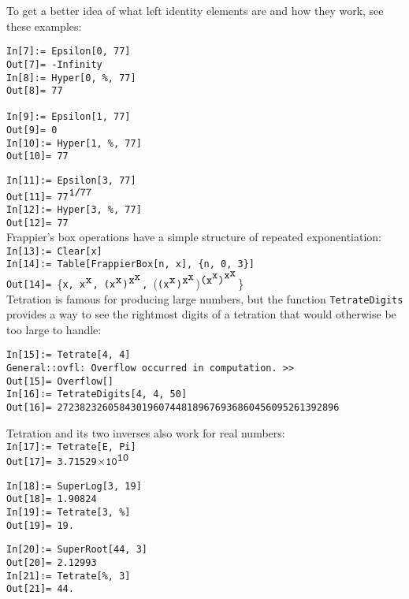\documentclass[letterpaper]{article}
\begin{document}
To get a better idea of what left identity elements are and how they work, see these examples:

\begin{verbatim}
In[7]:= Epsilon[0, 77] 
Out[7]= -Infinity
In[8]:= Hyper[0, %, 77]
Out[8]= 77

In[9]:= Epsilon[1, 77] 
Out[9]= 0
In[10]:= Hyper[1, %, 77]
Out[10]= 77
\end{verbatim}

\noindent\verb|In[11]:= Epsilon[3, 77]| \\
\noindent\verb|Out[11]= 77|$^{\verb|1/77|}$ \\
\noindent\verb|In[12]:= Hyper[3, %, 77]| \\
\noindent\verb|Out[12]= 77| \\

Frappier's box operations have a simple structure of repeated exponentiation: \\

\noindent\verb|In[13]:= Clear[x]| \\
\noindent\verb|In[14]:= Table[FrappierBox[n, x], {n, 0, 3}]| \\
\noindent\verb|Out[14]= |\bigg\{\verb|x, x|$^{\verb|x|}$\verb|, (x|$^{\verb|x|}$\verb|)|$^{{\verb|x|}^{\verb|x|}}$\verb|, |\big(\verb|(x|$^{\verb|x|}$\verb|)|$^{{\verb|x|}^{\verb|x|}}$\big)$^{\verb|(x|^{\verb|x|}\verb|)|^{{\verb|x|}^{\verb|x|}}}$\bigg\} \\

Tetration is famous for producing large numbers, but the function \verb|TetrateDigits| provides a way to see the rightmost digits of a tetration that would otherwise be too large to handle:

\begin{verbatim}
In[15]:= Tetrate[4, 4]
General::ovfl: Overflow occurred in computation. >>
Out[15]= Overflow[]
In[16]:= TetrateDigits[4, 4, 50]
Out[16]= 27238232605843019607448189676936860456095261392896
\end{verbatim}

Tetration and its two inverses also work for real numbers: \\

\noindent\verb|In[17]:= Tetrate[E, Pi]| \\
\noindent\verb|Out[17]= 3.71529|$\times {\verb|10|}^{\verb|10|}$

\begin{verbatim}
In[18]:= SuperLog[3, 19]
Out[18]= 1.90824
In[19]:= Tetrate[3, %]
Out[19]= 19.
\end{verbatim}
\begin{verbatim}
In[20]:= SuperRoot[44, 3]
Out[20]= 2.12993
In[21]:= Tetrate[%, 3]
Out[21]= 44.
\end{verbatim}
\end{document}
